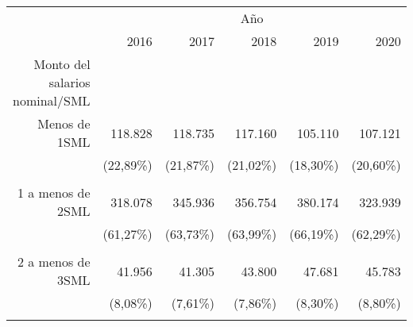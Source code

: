 \begin{tabular}{llllll}
\cline{1-6}
\multicolumn{1}{c}{} &
  \multicolumn{5}{|c}{Año} \\
\multicolumn{1}{c}{} &
  \multicolumn{1}{|r}{2016} &
  \multicolumn{1}{r}{2017} &
  \multicolumn{1}{r}{2018} &
  \multicolumn{1}{r}{2019} &
  \multicolumn{1}{r}{2020} \\
\cline{1-6}
\multicolumn{1}{r}{Monto del salarios nominal/SML} &
  \multicolumn{1}{|r}{} &
  \multicolumn{1}{r}{} &
  \multicolumn{1}{r}{} &
  \multicolumn{1}{r}{} &
  \multicolumn{1}{r}{} \\
\multicolumn{1}{r}{Menos de 1SML\hspace{1em}} &
  \multicolumn{1}{|r}{118.828} &
  \multicolumn{1}{r}{118.735} &
  \multicolumn{1}{r}{117.160} &
  \multicolumn{1}{r}{105.110} &
  \multicolumn{1}{r}{107.121} \\
\multicolumn{1}{r}{} &
  \multicolumn{1}{|r}{(22,89\%)} &
  \multicolumn{1}{r}{(21,87\%)} &
  \multicolumn{1}{r}{(21,02\%)} &
  \multicolumn{1}{r}{(18,30\%)} &
  \multicolumn{1}{r}{(20,60\%)} \\
\multicolumn{1}{r}{} &
  \multicolumn{1}{|r}{} &
  \multicolumn{1}{r}{} &
  \multicolumn{1}{r}{} &
  \multicolumn{1}{r}{} &
  \multicolumn{1}{r}{} \\
\multicolumn{1}{r}{1 a menos de 2SML\hspace{1em}} &
  \multicolumn{1}{|r}{318.078} &
  \multicolumn{1}{r}{345.936} &
  \multicolumn{1}{r}{356.754} &
  \multicolumn{1}{r}{380.174} &
  \multicolumn{1}{r}{323.939} \\
\multicolumn{1}{r}{} &
  \multicolumn{1}{|r}{(61,27\%)} &
  \multicolumn{1}{r}{(63,73\%)} &
  \multicolumn{1}{r}{(63,99\%)} &
  \multicolumn{1}{r}{(66,19\%)} &
  \multicolumn{1}{r}{(62,29\%)} \\
\multicolumn{1}{r}{} &
  \multicolumn{1}{|r}{} &
  \multicolumn{1}{r}{} &
  \multicolumn{1}{r}{} &
  \multicolumn{1}{r}{} &
  \multicolumn{1}{r}{} \\
\multicolumn{1}{r}{2 a menos de 3SML\hspace{1em}} &
  \multicolumn{1}{|r}{41.956} &
  \multicolumn{1}{r}{41.305} &
  \multicolumn{1}{r}{43.800} &
  \multicolumn{1}{r}{47.681} &
  \multicolumn{1}{r}{45.783} \\
\multicolumn{1}{r}{} &
  \multicolumn{1}{|r}{(8,08\%)} &
  \multicolumn{1}{r}{(7,61\%)} &
  \multicolumn{1}{r}{(7,86\%)} &
  \multicolumn{1}{r}{(8,30\%)} &
  \multicolumn{1}{r}{(8,80\%)} \\
\multicolumn{1}{r}{} &
  \multicolumn{1}{|r}{} &

\end{tabular}

